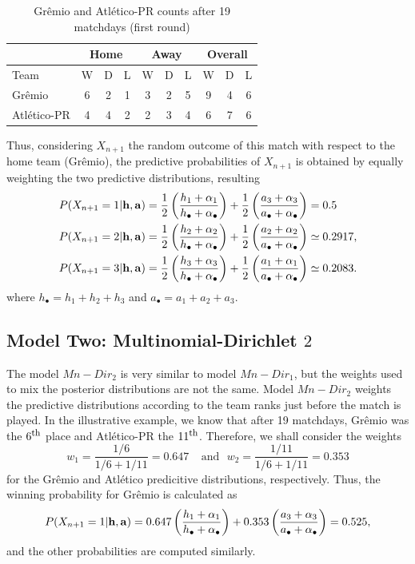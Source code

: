 \documentclass[journal,article,accept,moreauthors,pdftex,12pt,a4paper]{mdpi}
\begin{document}
	\begin{table}[!h]
		\begin{center}
			\begin{tabular}{lccccccccc}
				
				\hline
				& \multicolumn{3}{c}{Home} & \multicolumn{3}{c}{Away}& \multicolumn{3}{c}{Overall} \\
				\hline
				\hline
				Team & W & D & L & W & D & L & W & D & L\\
				\hline
				Gr\^emio & 6 & 2 & 1 & 3 & 2 & 5 & 9 & 4 & 6\\
				Atl\'etico-PR & 4 & 4 & 2 & 2 & 3 & 4 & 6 & 7 & 6\\
				\hline
			\end{tabular}
			\caption{Gr\^emio and Atl\'etico-PR counts after 19 matchdays (first round)}\label{tab:counts}
		\end{center}
	\end{table}
	
	Thus, considering $X_{n + 1}$ the random outcome of this match with
	respect to the home team (Gr\^{e}mio), the predictive probabilities
	of $X_{n + 1}$ is obtained by equally weighting the two predictive
	distributions, resulting
	\begin{align*}
	P(X_{n+1}=1|{\bf h}, {\bf a}) &=
	\frac{1}{2}\left(\frac{h_1+\alpha_1}{h_{\bullet}+\alpha_{\bullet}}\right)+\frac{1}{2}\left(\frac{a_3+\alpha_3}{a_{\bullet}+\alpha_{\bullet}}\right)=0.5
	\\
	P(X_{n+1}=2|{\bf h}, {\bf a}) &=
	\frac{1}{2}\left(\frac{h_2+\alpha_2}{h_{\bullet}+\alpha_{\bullet}}\right)+\frac{1}{2}\left(\frac{a_2+\alpha_2}{a_{\bullet}+\alpha_{\bullet}}\right)\simeq0.2917, \\
	P(X_{n+1}=3|{\bf h}, {\bf a}) &= \frac{1}{2}
	\left(\frac{h_3+\alpha_3}{h_{\bullet}+\alpha_{\bullet}}\right)+\frac{1}{2}\left(\frac{a_1+\alpha_1}{a_{\bullet}+\alpha_{\bullet}}\right)\simeq0.2083.
	\end{align*}
	\noindent where $h_{\bullet}=h_1+h_2+h_3$ and $a_{\bullet}=a_1+a_2+a_3$.
	
	\subsection{Model Two: Multinomial-Dirichlet $2$}
	\label{sec::Mn_Dir2}
	
	The model $Mn-Dir_2$ is very similar to model $Mn-Dir_1$, but the
	weights used to mix the posterior distributions are not the same.
	Model $Mn-Dir_2$ weights the predictive distributions according to
	the team ranks just before the match is played. In the illustrative
	example, we know that after 19 matchdays, Gr\^emio was the $6^{\footnotesize\mbox{th}}$
	place and Atl\'etico-PR the $11^{\footnotesize\mbox{th}}$. Therefore, we shall consider
	the weights
	\[w_1 = \frac{1/6}{1/6+1/11}=0.647 ~ ~ ~ ~ ~\text{and} ~ ~ ~ w_2 = \frac{1/11}{1/6+1/11}=0.353\]
	\noindent for the Gr\^emio and Atl\'etico predicitive distributions,
	respectively. Thus, the winning probability for Gr\^emio is
	calculated as
	\[P(X_{n+1}= 1|{\bf h}, {\bf a})=0.647\left(\frac{h_1+\alpha_1}{h_{\bullet}+\alpha_{\bullet}}\right)+0.353\left(\frac{a_3+\alpha_3}{a_{\bullet}+\alpha_{\bullet}}\right)=0.525,\]
	\noindent and the other probabilities are computed similarly.
	
\end{document}
